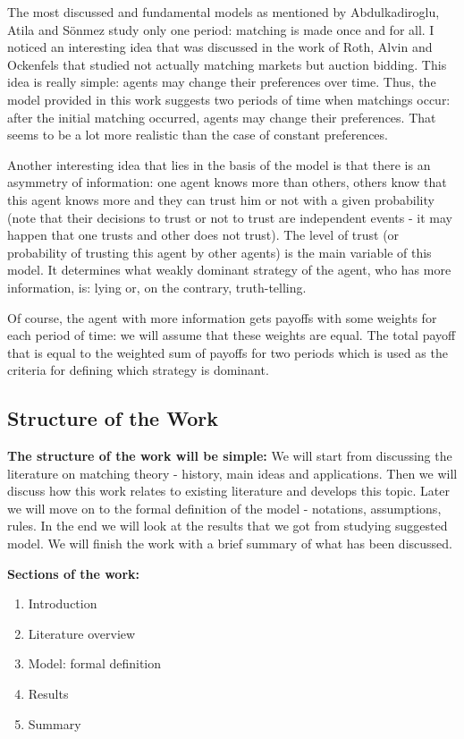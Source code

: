 \documentclass[a4paper]{article} %
\begin{document}
\hfill 
\break
The most discussed and fundamental models as mentioned by Abdulkadiroglu, Atila and Sönmez \cite{MainSource} study only one period: matching is made once and for all. I noticed an interesting idea that was discussed in the work of  Roth, Alvin and Ockenfels \cite{LastMinuteBidding} that studied not actually matching markets but auction bidding. This idea is really simple: agents may change their preferences over time.
Thus, the model provided in this work suggests two periods of time when matchings occur: after the initial matching occurred, agents may change their preferences. That seems to be a lot more realistic than the case of constant preferences.

\hfill 
\break
Another interesting idea that lies in the basis of the model is that there is an asymmetry of information: one agent knows more than others, others know that this agent knows more and they can trust him or not with a given probability (note that their decisions to trust or not to trust are independent events - it may happen that one trusts and other does not trust). The level of trust (or probability of trusting this agent by other agents) is the main variable of this model. It determines what weakly dominant strategy of the agent, who has more information, is: lying or, on the contrary, truth-telling.

\hfill 
\break
Of course, the agent with more information gets payoffs with some weights for each period of time: we will assume that these weights are equal. The total payoff that is equal to the weighted sum of payoffs for two periods which is used as the criteria for defining which strategy is dominant.





\subsection{Structure of the Work}
\textbf{The structure of the work will be simple:}
We will start from discussing the literature on matching theory - history, main ideas and applications. Then we will discuss how this work relates to existing literature and develops this topic. Later we will move on to the formal definition of the model - notations, assumptions, rules. In the end we will look at the results that we got from studying suggested model. We will finish the work with a brief summary of what has been discussed.

\hfill 
\break
\textbf{Sections of the work:}
\begin{enumerate}
    \item Introduction
    \item Literature overview
    \item Model: formal definition
    \item Results
    \item Summary
\end{enumerate}
\end{document}
